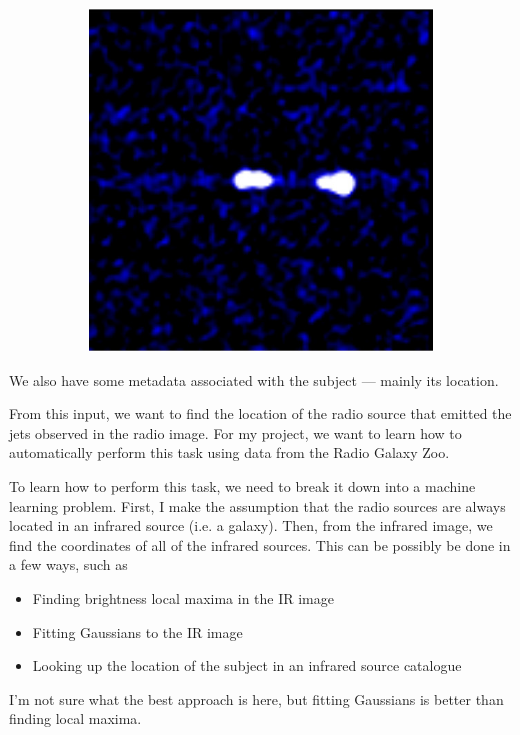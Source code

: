 \documentclass[a4paper]{article}
\begin{document}
\begin{figure}[!ht]
\begin{subfigure}{0.3\textwidth}
            \includegraphics[width=\linewidth]{images/ARG000180p_radio.jpg}
        \end{subfigure}
    \end{figure}

    We also have some metadata associated with the subject --- mainly its location.

    From this input, we want to find the location of the radio source that emitted the jets observed in the radio image. For my project, we want to learn how to automatically perform this task using data from the Radio Galaxy Zoo.

    To learn how to perform this task, we need to break it down into a machine learning problem. First, I make the assumption that the radio sources are always located in an infrared source (i.e. a galaxy). Then, from the infrared image, we find the coordinates of all of the infrared sources. This can be possibly be done in a few ways, such as
    \begin{itemize}
        \item Finding brightness local maxima in the IR image
        \item Fitting Gaussians to the IR image
        \item Looking up the location of the subject in an infrared source catalogue
    \end{itemize}
    I'm not sure what the best approach is here, but fitting Gaussians is better than finding local maxima.
\end{document}
